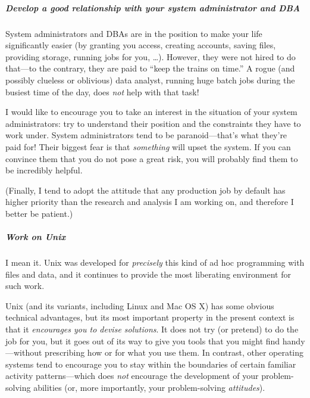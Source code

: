 \begin{unnumlist}
\subparagraph{Develop a good relationship with your system administrator
  and DBA}
\item System administrators and DBAs are in the position to make
your life significantly easier (by granting you access, creating
accounts, saving files, providing storage, running jobs for you,
\dots). However, they were not hired to do that---to the contrary,
they are paid to ``keep the trains on time.'' A rogue (and possibly
clueless or oblivious) data analyst, running huge batch jobs during
the busiest time of the day, does \emph{not} help with that task!\vspace*{6pt}

I would like to encourage you to take an interest in the situation of
your system administrators: try to understand their position and the
constraints they have to work under. System administrators tend to be
paranoid---that's what they're paid for! Their biggest fear is that
\emph{something} will upset the system. If you can convince them that
you do not pose a great risk, you will probably find them to be
incredibly helpful.\vspace*{6pt}

(Finally, I tend to adopt the attitude that any production job by
default has higher priority than the research and analysis I am
working on, and therefore I better be patient.)

\subparagraph{Work on Unix}
\item I mean it. Unix was developed for  
\emph{precisely} this kind of ad hoc programming with files and data,
and it continues to provide the most liberating environment for such
work.\vspace*{6pt}


Unix (and its variants, including Linux and Mac OS X) has some obvious
technical advantages, but its most important property in the present
context is that it \emph{encourages you to devise solutions}. It does
not try (or pretend) to do the job for you, but it goes out of its way
to give you tools that you might find handy---without prescribing how
or for what you use them. In contrast, other operating systems tend to
encourage you to stay within the boundaries of certain familiar
activity patterns---which does \emph{not} encourage the development of
your problem-solving abilities (or, more importantly, your
problem-solving \emph{attitudes}).\vspace*{6pt}


\end{unnumlist}
